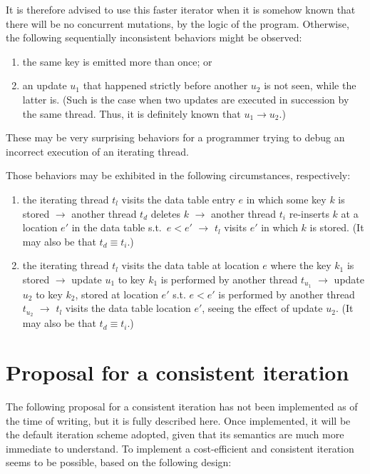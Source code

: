 It is therefore advised to use this faster iterator when it is somehow known that there will be no concurrent mutations, by the logic of the program.
Otherwise, the following sequentially inconsistent behaviors might be observed:
\begin{enumerate}
    \item the same key is emitted more than once; or
    \item an update $u_1$ that happened strictly before another $u_2$ is not seen, while the latter is.
    (Such is the case when two updates are executed in succession by the same thread.
    Thus, it is definitely known that $u_1 \rightarrow u_2$.)
\end{enumerate}

These may be very surprising behaviors for a programmer trying to debug an incorrect execution of an iterating thread.

Those behaviors may be exhibited in the following circumstances, respectively:
\begin{enumerate}
    \item the iterating thread $t_l$ visits the data table entry $e$ in which some key $k$ is stored $\rightarrow$ another thread $t_d$ deletes $k$ $\rightarrow$ another thread $t_i$ re-inserts $k$ at a location $e'$ in the data table s.t.\ $e < e'$ $\rightarrow$ $t_l$ visits $e'$ in which $k$ is stored.
    (It may also be that $t_d \equiv t_i$.)
    \item the iterating thread $t_l$ visits the data table at location $e$ where the key $k_1$ is stored $\rightarrow$ update $u_1$ to key $k_1$ is performed by another thread $t_{u_1}$ $\rightarrow$ update $u_2$ to key $k_2$, stored at location $e'$ s.t. $e < e'$ is performed by another thread $t_{u_2}$ $\rightarrow$ $t_l$ visits the data table location $e'$, seeing the effect of update $u_2$.
    (It may also be that $t_d \equiv t_i$.)
\end{enumerate}


\section{Proposal for a consistent iteration}\label{sec:consistent-iteration}

The following proposal for a consistent iteration has not been implemented as of the time of writing, but it is fully described here.
Once implemented, it will be the default iteration scheme adopted, given that its semantics are much more immediate to understand.
To implement a cost-efficient and consistent iteration seems to be possible, based on the following design:

